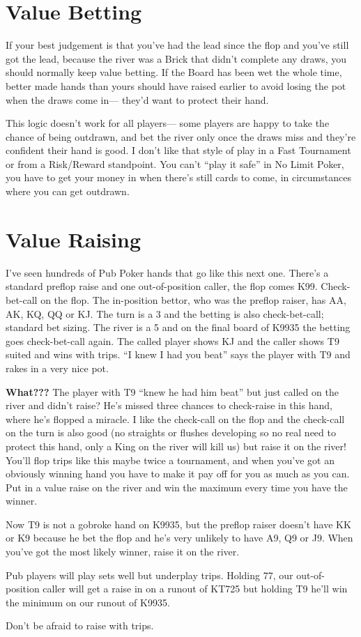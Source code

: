 \section{Value Betting}

If your best judgement is that you've had the lead since the flop
and you've still got the lead, because the river was a Brick
that didn't complete any draws, you should normally keep value betting.
If the Board has been wet the whole time, better made hands than
yours should have raised earlier to avoid losing the pot when the
draws come in--- they'd want to protect their hand.

This logic doesn't work for all players--- some players are happy
to take the chance of being outdrawn, and bet the river only once
the draws miss and they're confident their hand is good. I don't
like that style of play in a Fast Tournament or from a
Risk/Reward standpoint. You can't ``play it safe'' in No Limit Poker,
you have to get your money in when there's still cards to come, in
circumstances where you can get outdrawn.

\section{Value Raising}

I've seen hundreds of Pub Poker hands that go like this next
one. There's a standard preflop raise and one out-of-position caller,
the flop comes K99. Check-bet-call on the flop. The in-position
bettor, who was the preflop raiser, has AA, AK, KQ, QQ or KJ. The turn
is a 3 and the betting is also check-bet-call; standard bet
sizing. The river is a 5 and on the final board of K9935 the betting
goes check-bet-call again. The called player shows KJ and the caller
shows T9 suited and wins with trips. ``I knew I had you beat'' says the
player with T9 and rakes in a very nice pot.

\textbf{What???} The player with T9 ``knew he had him beat'' but just
called on the river and didn't raise? He's missed three chances to
check-raise in this hand, where he's flopped a miracle. I like the
check-call on the flop and the check-call on the turn is also good (no
straights or flushes developing so no real need to protect this hand,
only a King on the river will kill us) but raise it on the river!
You'll flop trips like this maybe twice a tournament, and when you've
got an obviously winning hand you have to make it pay off for you as
much as you can. Put in a value raise on the river and win the maximum
every time you have the winner.

Now T9 is not a gobroke hand on K9935, but the preflop raiser doesn't
have KK or K9 because he bet the flop and he's very unlikely to have
A9, Q9 or J9. When you've got the most likely winner, raise it on
the river.

Pub players will play sets well but underplay trips. Holding 77,
our out-of-position caller will get a raise in on a runout of
KT725 but holding T9 he'll win the minimum on our runout of K9935.

Don't be afraid to raise with trips.
